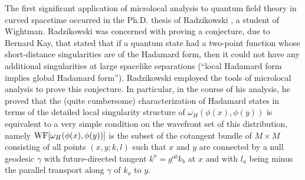 \documentclass[12pt,epsf,amsfonts,amssymb]{article}
\begin{document}
The first significant application of microlocal analysis to quantum
field theory in curved spacetime occurred in the Ph.D. thesis of
Radzikowski \cite{r}, a student of Wightman. Radzikowski was concerned
with proving a conjecture, due to Bernard Kay, that stated that if a
quantum state had a two-point function whose short-distance
singularities are of the Hadamard form, then it could not have any
additional singularities at large spacelike separations (``local
Hadamard form implies global Hadamard form''). Radzikowski employed
the tools of microlocal analysis to prove this
conjecture.  In particular, in the course of his analysis, he proved
that the (quite cumbersome) characterization of Hadamard states in
terms of the detailed local singularity structure of $\omega_H
(\phi(x), \phi(y))$ is equivalent to a very simple condition on the
wavefront set of this distribution, namely ${\rm WF} [\omega_H
(\phi(x), \phi(y))]$ is the subset of the cotangent bundle of $M
\times M$ consisting of all points $(x,y;k,l)$ such that $x$ and $y$
are connected by a null geodesic $\gamma$ with future-directed tangent
$k^a = g^{ab} k_b$ at $x$ and with $l_a$ being minus the parallel
transport along $\gamma$ of $k_a$ to $y$.
\end{document}
